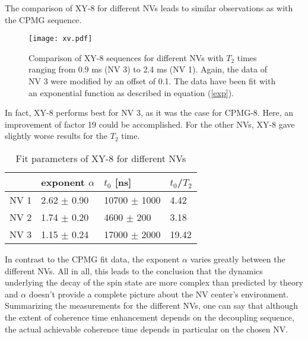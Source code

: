 \documentclass[12pt,a4paper]{article}
\begin{document}
The comparison of XY-8 for different NVs leads to similar observations as with the CPMG sequence.\\
\begin{figure}[H] 
\texttt{[image: xv.pdf]} 
\caption{Comparison of XY-8 sequences for different NVs with $T_2$ times ranging from 0.9 ms (NV 3) to 2.4 ms (NV 1). Again, the data of NV 3 were modified by an offset of 0.1. The data have been fit with an exponential function as described in equation (\ref{exp}).}
\label{X8}
\end{figure}
In fact, XY-8 performs best for NV 3, as it was the case for CPMG-8. Here, an improvement of factor 19 could be accomplished. For the other NVs, XY-8 gave slightly worse results for the $T_2$ time.\\
\begin{table}[H]
\centering
\caption{Fit parameters of XY-8 for different NVs}
\label{X8t}
\begin{tabular}{l|ll|l}
& exponent $\alpha$ & $t_0$ {[}ns{]}                                              & $t_0$/$T_2$              \\\hline
NV 1            & 2.62         $\pm$ 0.90 & 10700         $\pm$ 1000         & 4.42 \\
NV 2            & 1.74         $\pm$ 0.20 & 4600         $\pm$ 200        & 3.18 \\
NV 3            & 1.15          $\pm$ 0.24 & 17000        $\pm$ 2000         & 19.42
\end{tabular}
\end{table}
In contrast to the CPMG fit data, the exponent $\alpha$ varies greatly between the different NVs.
All in all, this leads to the conclusion that the dynamics underlying the decay of the spin state are more complex than predicted by theory and $\alpha$ doesn't provide a complete picture about the NV center's environment.\\
Summarizing the measurements for the different NVs, one can say that although the extent of coherence time enhancement depends on the decoupling sequence, the actual achievable coherence time depends in particular on the chosen NV.
\end{document}
